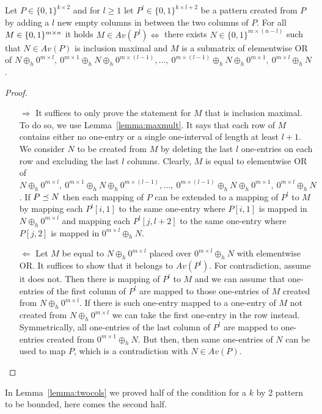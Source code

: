 \begin{thm}
Let $P\in\{0,1\}^{k\times2}$ and for $l\geq1$ let $P^l\in\{0,1\}^{k\times l+2}$ be a pattern created from $P$ by adding a $l$ new empty columns in between the two columns of $P$. For all $M\in\{0,1\}^{m\times n}$ it holds $M\in Av(P^l)\Leftrightarrow$ there exists $N\in\{0,1\}^{m\times(n-l)}$ such that $N\in Av(P)$ is inclusion maximal and $M$ is a submatrix of elementwise OR of $N\oplus_h0^{m\times l},\ 0^{m\times 1}\oplus_hN\oplus_h0^{m\times(l-1)},\dots,\ 0^{m\times(l-1)}\oplus_hN\oplus_h0^{m\times1},\ 0^{m\times l}\oplus_hN$.
\end{thm}
\begin{proof}
\begin{itemize}
	\item[$\Rightarrow$] It suffices to only prove the statement for $M$ that is inclusion maximal. To do so, we use Lemma~\ref{lemma:maxmult}. It says that each row of $M$ contains either no one-entry or a single one-interval of length at least $l+1$. We consider $N$ to be created from $M$ by deleting the last $l$ one-entries on each row and excluding the last $l$ columns. Clearly, $M$ is equal to elementwise OR of $N\oplus_h0^{m\times l},\ 0^{m\times 1}\oplus_hN\oplus_h0^{m\times(l-1)},\dots,\ 0^{m\times(l-1)}\oplus_hN\oplus_h0^{m\times1},\ 0^{m\times l}\oplus_hN$. If $P\preceq N$ then each mapping of $P$ can be extended to a mapping of $P^l$ to $M$ by mapping each $P^l[i,1]$ to the same one-entry where $P[i,1]$ is mapped in $N\oplus_h0^{m\times l}$ and mapping each $P^l[j,l+2]$ to the same one-entry where $P[j,2]$ is mapped in $0^{m\times l}\oplus_hN$.
	\item[$\Leftarrow$] Let $M$ be equal to $N\oplus_h0^{m\times l}$ placed over $0^{m\times l}\oplus_hN$ with elementwise OR. It suffices to show that it belongs to $Av(P^l)$. For contradiction, assume it does not. Then there is mapping of $P^l$ to $M$ and we can assume that one-entries of the first column of $P^l$ are mapped to those one-entries of $M$ created from $N\oplus_h0^{m\times l}$. If there is such one-entry mapped to a one-entry of $M$ not created from $N\oplus_h0^{m\times l}$ we can take the first one-entry in the row instead. Symmetrically, all one-entries of the last column of $P^l$ are mapped to one-entries created from $0^{m\times1}\oplus_hN$. But then, then same one-entries of $N$ can be used to map $P$, which is a contradiction with $N\in Av(P)$.
\end{itemize}
\end{proof}

In Lemma~\ref{lemma:twocols} we proved half of the condition for a $k$ by 2 pattern to be bounded, here comes the second half.

